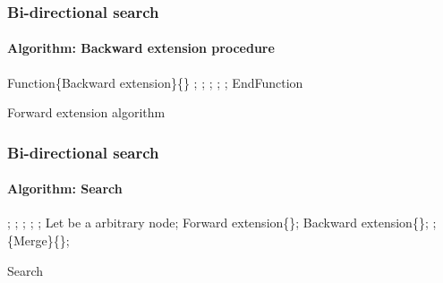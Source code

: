 \begin{frame}
  \frametitle{Bi-directional search}
  \framesubtitle{Algorithm: Backward extension procedure}
  \begin{algorithm}[H]
    \scriptsize
    \begin{algorithmic}[1]
      \STATE Function\{Backward extension\}\{\}
        \label{algo3:setp:explore_arcs}
          \STATE {};
              \STATE {};
            \ENDIF
          \ENDFOR
          \STATE {};
            \STATE {};
          \ENDIF
        \ENDFOR
        \STATE {};
     \STATE EndFunction
    \end{algorithmic}
    \caption{Forward extension algorithm}
    \label{alg3:backward_extension}
  \end{algorithm}
\end{frame}


\begin{frame}
  \frametitle{Bi-directional search}
  \framesubtitle{Algorithm: Search}
  \begin{algorithm}[H]
    \scriptsize
    \begin{algorithmic}[1]
      \REQUIRE {}
      \STATE {};
      \STATE {};
      \STATE {};
      \STATE {};
      \STATE {};
      \label{algo1:setp:main_while}
        \STATE Let  be a  arbitrary node;
        \STATE Forward extension\{\};
        \STATE Backward extension\{\};
        \STATE {};
      \ENDWHILE
      \STATE \{Merge\}\{\};
    \end{algorithmic}
    \caption{Search}
    \label{alg3:main}
  \end{algorithm}
\end{frame}

